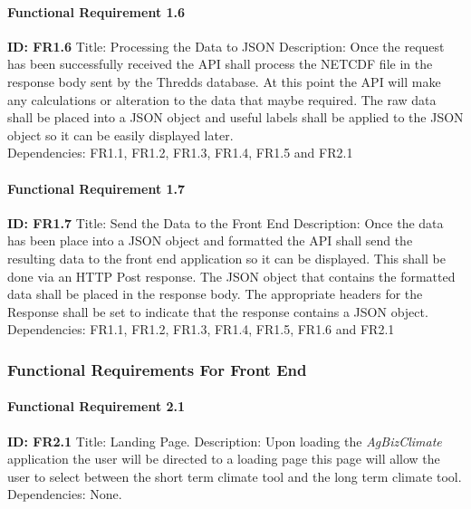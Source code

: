 \documentclass[onecolumn, draftclsnofoot,10pt, compsoc]{article}
\begin{document}
					\paragraph{Functional Requirement 1.6}
							\textbf{ID: FR1.6}\hfill \break
							Title: Processing the Data to JSON\hfill \break
							Description: Once the request has been successfully received the API shall process the NETCDF file in the response body sent by the Thredds database. At this point the API will make any calculations or alteration to the data that maybe required. The raw data shall be placed into a JSON object and useful labels shall be applied to the JSON object so it can be easily displayed later.\\
							Dependencies: FR1.1, FR1.2, FR1.3, FR1.4, FR1.5 and FR2.1\hfill \break

					\paragraph{Functional Requirement 1.7}
						\textbf{ID: FR1.7}\hfill \break
						Title: Send the Data to the Front End\hfill \break
						Description: Once the data has been place into a JSON object and formatted the API shall send the resulting data to the front end application so it can be displayed. This shall be done via an HTTP Post response. The JSON object that contains the formatted data shall be placed in the response body. The appropriate headers for the Response shall be set to indicate that the response contains a JSON object.\\
						Dependencies: FR1.1, FR1.2, FR1.3, FR1.4, FR1.5, FR1.6 and FR2.1\hfill \break

			\subsubsection{Functional Requirements For Front End}

				\paragraph{Functional Requirement 2.1}
					\textbf{ID: FR2.1}\hfill \break
					Title: Landing Page.\hfill \break
					Description: Upon loading the \textit{AgBizClimate} application the user will be directed to a loading page this page will allow the user to select between the short term climate tool and the long term climate tool.\\
					Dependencies: None.\hfill \break
\end{document}
